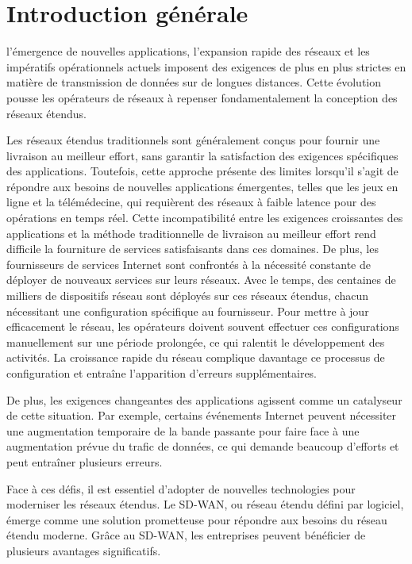 \documentclass[a4paper,12pt]{report}
\begin{document}
	\pagestyle{empty}

	\section*{Introduction générale}
l'émergence de nouvelles applications, l'expansion rapide des réseaux et les impératifs opérationnels actuels imposent des exigences de plus en plus strictes en matière de transmission de données sur de longues distances. Cette évolution pousse les opérateurs de réseaux à repenser fondamentalement la conception des réseaux étendus.

Les réseaux étendus traditionnels sont généralement conçus pour fournir une livraison au meilleur effort, sans garantir la satisfaction des exigences spécifiques des applications. Toutefois, cette approche présente des limites lorsqu'il s'agit de répondre aux besoins de nouvelles applications émergentes, telles que les jeux en ligne et la télémédecine, qui requièrent des réseaux à faible latence pour des opérations en temps réel. Cette incompatibilité entre les exigences croissantes des applications et la méthode traditionnelle de livraison au meilleur effort rend difficile la fourniture de services satisfaisants dans ces domaines.
De plus, les fournisseurs de services Internet sont confrontés à la nécessité constante de déployer de nouveaux services sur leurs réseaux. Avec le temps, des centaines de milliers de dispositifs réseau sont déployés sur ces réseaux étendus, chacun nécessitant une configuration spécifique au fournisseur. Pour mettre à jour efficacement le réseau, les opérateurs doivent souvent effectuer ces configurations manuellement sur une période prolongée, ce qui ralentit le développement des activités. La croissance rapide du réseau complique davantage ce processus de configuration et entraîne l'apparition d'erreurs supplémentaires.

De plus, les exigences changeantes des applications agissent comme un catalyseur de cette situation. Par exemple, certains événements Internet peuvent nécessiter une augmentation temporaire de la bande passante pour faire face à une augmentation prévue du trafic de données, ce qui demande beaucoup d'efforts et peut entraîner plusieurs erreurs.

Face à ces défis, il est essentiel d'adopter de nouvelles technologies pour moderniser les réseaux étendus. Le SD-WAN, ou réseau étendu défini par logiciel, émerge comme une solution prometteuse pour répondre aux besoins du réseau étendu moderne. Grâce au SD-WAN, les entreprises peuvent bénéficier de plusieurs avantages significatifs.
\end{document}
